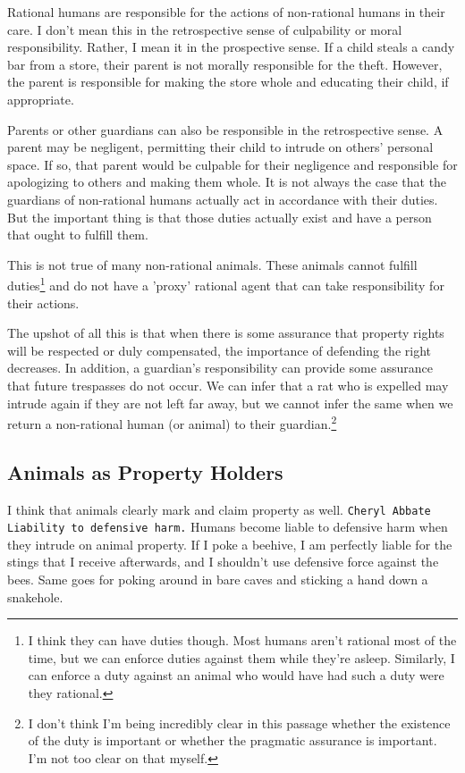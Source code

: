 \documentclass[12pt]{book}
\begin{document}
		Rational humans are responsible for the actions of non-rational
		humans in their care. I don't mean this in the retrospective sense
		of culpability or moral responsibility. Rather, I mean it in the
		prospective sense. If a child steals a candy bar from a store, their
		parent is not morally responsible for the theft. However, the parent
		is responsible for making the store whole and educating their child,
		if appropriate.

		Parents or other guardians can also be responsible in the retrospective
		sense. A parent may be negligent, permitting their child to intrude on
		others' personal space. If so, that parent would be culpable for their
		negligence and responsible for apologizing to others and making them
		whole.  It is not always the case that the guardians of non-rational
		humans actually act in accordance with their duties. But the important
		thing is that those duties actually exist and have a person that ought
		to fulfill them.

		This is not true of many non-rational animals. These animals cannot
		fulfill duties\footnote{I think they can have duties though. Most humans 
		aren't rational most of the time, but we can enforce duties against
		them while they're asleep. Similarly, I can enforce a duty against an animal
		who would have had such a duty were they rational.} and do not have
		a 'proxy' rational agent that can take responsibility for their
		actions.

		The upshot of all this is that when there is some assurance that
		property rights will be respected or duly compensated, the importance
		of defending the right decreases. In addition, a guardian's
		responsibility can provide some assurance that future trespasses do not
		occur. We can infer that a rat who is expelled may intrude again if
		they are not left far away, but we cannot infer the same when we return
		a non-rational human (or animal) to their guardian.\footnote{I don't
		think I'm being incredibly clear in this passage whether the existence
		of the duty is important or whether the pragmatic assurance is important.
		I'm not too clear on that myself.}


\subsection{Animals as Property Holders}

	I think that animals clearly mark and claim property as well.
	\texttt{Cheryl Abbate Liability to defensive harm.} Humans become liable to
	defensive harm when they intrude on animal property.  If I poke a beehive,
	I am perfectly liable for the stings that I receive afterwards, and I
	shouldn’t use defensive force against the bees.  Same goes for poking
	around in bare caves and sticking a hand down a snakehole.
\end{document}
